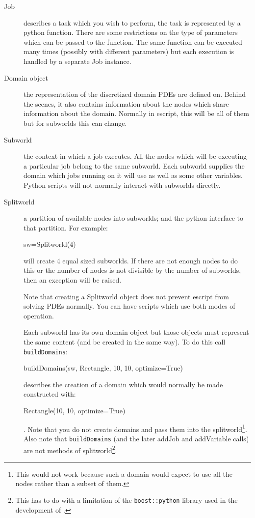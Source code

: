 \begin{description}
 \item[Job] describes a task which you wish to perform, the task is represented by a python function.
There are some restrictions on the type of parameters which can be passed to the function. 
The same function can be executed many times (possibly with different parameters) but each execution is 
handled by a separate Job instance.
\item[Domain object] the representation of the discretized domain PDEs are defined on.
Behind the scenes, it also contains information about the nodes which share information about the domain.
Normally in escript, this will be all of them but for subworlds this can change.
\item[Subworld] the context in which a job executes.
All the nodes which will be executing a particular job belong to the same subworld.
Each subworld supplies the domain which jobs running on it will use as well as some other variables.
Python scripts will not normally interact with subworlds directly.
\item[Splitworld] a partition of available nodes into subworlds; and the python interface to that partition.
For example:
\begin{python}
sw=Splitworld(4) 
\end{python}
will create 4 equal sized subworlds.
If there are not enough nodes to do this or the number of nodes is not divisible by the 
number of subworlds, then an exception will be raised.

Note that creating a Splitworld object does not prevent escript from solving PDEs normally.
You can have scripts which use both modes of operation.

Each subworld has its own domain object but those objects must represent the same content (and be created in the same way).
To do this call \texttt{buildDomains}:
\begin{python}
buildDomains(sw, Rectangle,  10, 10, optimize=True)
\end{python}
describes the creation of a domain which would normally be made constructed with:
\begin{python}
Rectangle(10, 10, optimize=True)
\end{python}.
Note that you do not create domains and pass them into the splitworld\footnote{
This would not work because such a domain would expect to use all the nodes rather than a subset of them.}.
Also note that \texttt{buildDomains} (and the later addJob and addVariable calls) are not methods of splitworld\footnote{
This has to do with a limitation of the \texttt{boost::python} library used in the development of \escript.}.


\end{description}
